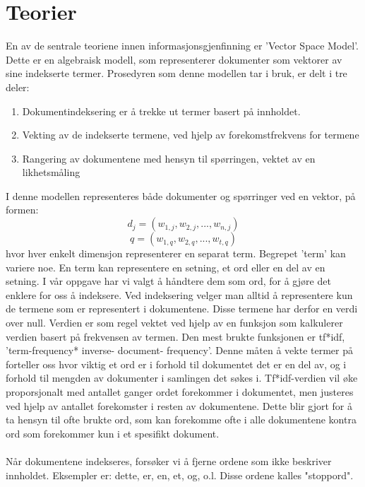 \section{Teorier}
En av de sentrale teoriene innen informasjonsgjenfinning er 'Vector Space Model'. Dette er en algebraisk modell, som representerer dokumenter som vektorer av sine indekserte termer. Prosedyren som denne modellen tar i bruk, er delt i tre deler:
\begin{enumerate}
\item{Dokumentindeksering er å trekke ut termer basert på innholdet.}
\item{Vekting av de indekserte termene, ved hjelp av forekomstfrekvens for termene}
\item{Rangering av dokumentene med hensyn til spørringen, vektet av en likhetsmåling}
\end{enumerate}
I denne modellen representeres både dokumenter og spørringer ved en vektor, på formen: \[d_j = (w_{1,j}, w_{2,j}, ..., w_{n,j})
\]
\[ 
q = (w_{1,q}, w_{2,q}, ..., w_{t,q})
\]
hvor hver enkelt dimensjon representerer en separat term. Begrepet 'term' kan variere noe. En term kan representere en setning, et ord eller en del av en setning. I vår oppgave har vi valgt å håndtere dem som ord, for å gjøre det enklere for oss å indeksere. Ved indeksering velger man alltid å representere kun de termene som er representert i dokumentene. Disse termene har derfor en verdi over null. Verdien er som regel vektet ved hjelp av en funksjon som kalkulerer verdien basert på frekvensen av termen. Den mest brukte funksjonen er tf*idf, 'term-frequency* inverse- document- frequency'. Denne måten å vekte termer på forteller oss hvor viktig et ord er i forhold til dokumentet det er en del av, og i forhold til mengden av dokumenter i samlingen det søkes i. Tf*idf-verdien vil øke proporsjonalt med antallet ganger ordet forekommer i dokumentet, men justeres ved hjelp av antallet forekomster i resten av dokumentene. Dette blir gjort for å ta hensyn til ofte brukte ord, som kan forekomme ofte i alle dokumentene kontra ord som forekommer kun i et spesifikt dokument. 

\paragraph{}
Når dokumentene indekseres, forsøker vi å fjerne ordene som ikke beskriver innholdet. Eksempler er: dette, er, en, et, og, o.l. Disse ordene kalles "stoppord". 

